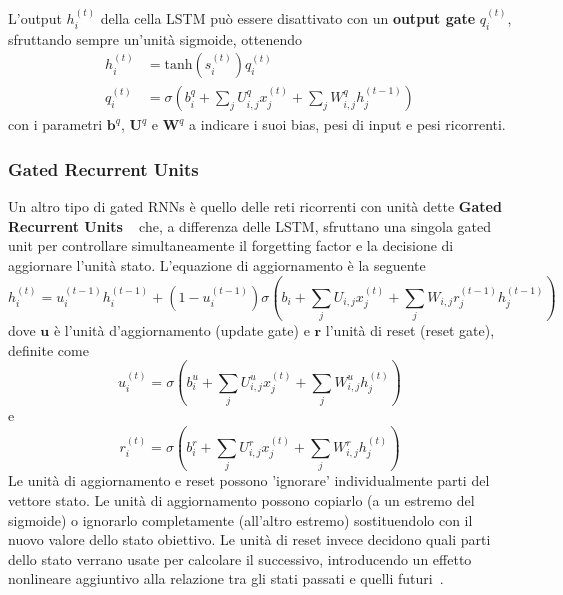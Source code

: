 \documentclass[12pt,a4paper]{report}
\begin{document}
    L'output $h_i^{(t)}$ della cella LSTM pu\`o essere disattivato con
    un \textbf{output gate} $q_i^{(t)}$, sfruttando sempre un'unit\`a
    sigmoide, ottenendo
    \begin{align}
        h_i^{(t)}&=\text{tanh}(s_i^{(t)})q_i^{(t)}\\
        q_i^{(t)}&=\sigma\left(b_i^q+
        \sum\limits_jU_{i,j}^qx_j^{(t)}+
        \sum\limits_jW_{i,j}^qh_j^{(t-1)}\right)
    \end{align}
    con i parametri $\boldsymbol{b}^q$, $\boldsymbol{U}^q$ e 
    $\boldsymbol{W}^q$ a indicare i suoi bias, pesi di input e pesi 
    ricorrenti.

    \subsubsection{Gated Recurrent Units}
    Un altro tipo di gated RNNs \`e quello delle reti ricorrenti con
    unit\`a dette \textbf{Gated Recurrent Units} ~\cite{gru} che, a 
    differenza delle LSTM, sfruttano una singola gated unit per controllare 
    simultaneamente il forgetting factor e la decisione di aggiornare 
    l'unit\`a stato. L'equazione di aggiornamento \`e la seguente
    \begin{equation}
        h_i^{(t)}=u_i^{(t-1)}h_i^{(t-1)}+(1-u_i^{(t-1)})
        \sigma\left(b_i+
        \sum\limits_jU_{i,j}x_j^{(t)}+
        \sum\limits_jW_{i,j}r_j^{(t-1)}h_j^{(t-1)}\right)
    \end{equation}
    dove $\boldsymbol{u}$ \`e l'unit\`a d'aggiornamento (update gate) e
    $\boldsymbol{r}$ l'unit\`a di reset (reset gate), definite come
    \begin{equation}
        u_i^{(t)}=\sigma\left(b_i^u+
        \sum\limits_jU_{i,j}^ux_j^{(t)}+
        \sum\limits_jW_{i,j}^uh_j^{(t)}\right)
    \end{equation}
    e
    \begin{equation}
        r_i^{(t)}=\sigma\left(b_i^r+
        \sum\limits_jU_{i,j}^rx_j^{(t)}+
        \sum\limits_jW_{i,j}^rh_j^{(t)}\right)
    \end{equation}
    Le unit\`a di aggiornamento e reset possono 'ignorare' 
    individualmente parti del vettore stato. Le unit\`a di aggiornamento
    possono copiarlo (a un estremo del sigmoide) o ignorarlo 
    completamente (all'altro estremo) sostituendolo con il nuovo valore
    dello stato obiettivo. Le unit\`a di reset invece decidono quali 
    parti dello stato verrano usate per calcolare il successivo, 
    introducendo un effetto nonlineare aggiuntivo alla relazione tra gli
    stati passati e quelli futuri~\cite{Goodfellow-et-al-2016}.
\end{document}
